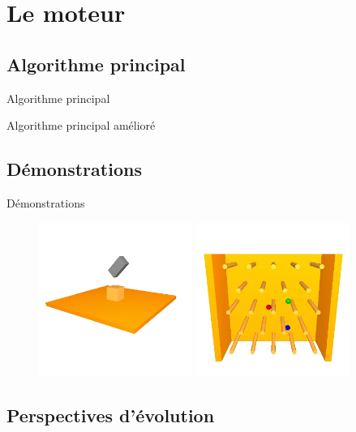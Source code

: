 \documentclass{beamer}
\begin{document}
\section{Le moteur}

\subsection{Algorithme principal}

\begin{frame}{Algorithme principal}
\end{frame}

\begin{frame}{Algorithme principal amélioré}

\end{frame}

\subsection{Démonstrations}

\begin{frame}{Démonstrations}
  \begin{figure}
    \includegraphics[width=5cm]{images/box.jpg}
    \includegraphics[width=5cm]{images/pachinko.jpg}
  \end{figure}
\end{frame}

\subsection{Perspectives d'évolution}
\end{document}
